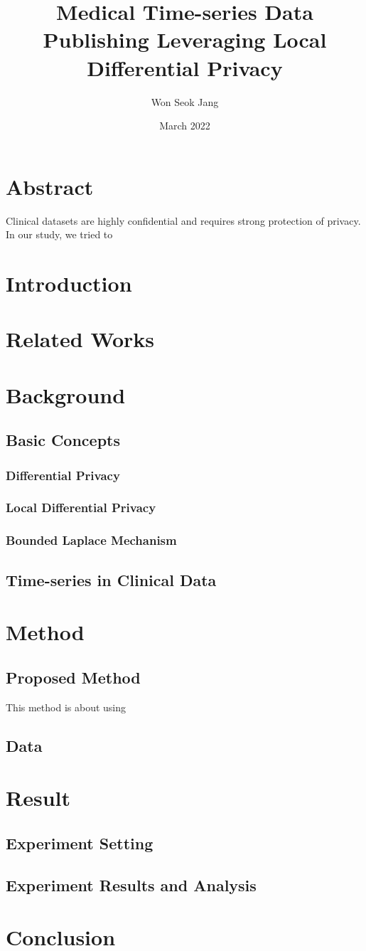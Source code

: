 \documentclass{article}
\title{Medical Time-series Data Publishing Leveraging Local Differential Privacy}
\author{Won Seok Jang}
\date{March 2022}
\begin{document}
\maketitle
\section{Abstract}
Clinical datasets are highly confidential and requires strong protection of privacy. In our study, we tried to 
\section{Introduction}



\section{Related Works}

\section{Background}
\subsection{Basic Concepts}
\subsubsection{Differential Privacy}
\subsubsection{Local Differential Privacy}
\subsubsection{Bounded Laplace Mechanism}
\subsection{Time-series in Clinical Data}

\section{Method}
\subsection{Proposed Method}
This method is about using


\subsection{Data}

\section{Result}
\subsection{Experiment Setting}
\subsection{Experiment Results and Analysis}

\section{Conclusion}
\end{document}

